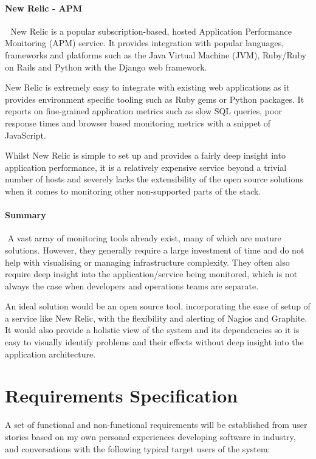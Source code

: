 \documentclass{cshonours}
\begin{document}
\subsubsection{New Relic - APM} 
New Relic is a popular subscription-based, hosted Application Performance Monitoring (APM) service. It provides integration with popular languages, frameworks and platforms such as the Java Virtual Machine (JVM), Ruby/Ruby on Rails and Python with the Django web framework.

New Relic is extremely easy to integrate with existing web applications as it provides environment specific tooling such as Ruby gems or Python packages. It reports on fine-grained application metrics such as slow SQL queries, poor response times and browser based monitoring metrics with a snippet of JavaScript.

Whilst New Relic is simple to set up and provides a fairly deep insight into application performance, it is a relatively expensive service beyond a trivial number of hosts and severely lacks the extensibility of the open source solutions when it comes to monitoring other non-supported parts of the stack.

\subsubsection{Summary}
 A vast array of monitoring tools already exist, many of which are mature solutions. However, they generally require a large investment of time and do not help with visualising or managing infrastructure complexity. They often also require deep insight into the application/service being monitored, which is not always the case when developers and operations teams are separate.

An ideal solution would be an open source tool, incorporating the ease of setup of a service like New Relic, with the flexibility and alerting of Nagios and Graphite. It would also provide a holistic view of the system and its dependencies so it is easy to visually identify problems and their effects without deep insight into the application architecture.


\chapter{Requirements Specification}

A set of functional and non-functional requirements will be established from user stories based on my own personal experiences developing software in industry, and conversations with the following typical target users of the system:
\end{document}
